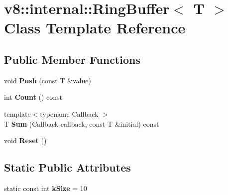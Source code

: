 \hypertarget{classv8_1_1internal_1_1_ring_buffer}{}\section{v8\+:\+:internal\+:\+:Ring\+Buffer$<$ T $>$ Class Template Reference}
\label{classv8_1_1internal_1_1_ring_buffer}
\subsection*{Public Member Functions}
\begin{DoxyCompactItemize}
\item 
void {\bfseries Push} (const T \&value)\hypertarget{classv8_1_1internal_1_1_ring_buffer_a50e222feefcec4e624034aebc8232996}{}\label{classv8_1_1internal_1_1_ring_buffer_a50e222feefcec4e624034aebc8232996}

\item 
int {\bfseries Count} () const \hypertarget{classv8_1_1internal_1_1_ring_buffer_a231e025f0bfcef3e488377eb386d456b}{}\label{classv8_1_1internal_1_1_ring_buffer_a231e025f0bfcef3e488377eb386d456b}

\item 
{\footnotesize template$<$typename Callback $>$ }\\T {\bfseries Sum} (Callback callback, const T \&initial) const \hypertarget{classv8_1_1internal_1_1_ring_buffer_a3c727c135f918833c5d12d556b6c38a7}{}\label{classv8_1_1internal_1_1_ring_buffer_a3c727c135f918833c5d12d556b6c38a7}

\item 
void {\bfseries Reset} ()\hypertarget{classv8_1_1internal_1_1_ring_buffer_a0306040d131c93200cc6d132c23bc006}{}\label{classv8_1_1internal_1_1_ring_buffer_a0306040d131c93200cc6d132c23bc006}

\end{DoxyCompactItemize}
\subsection*{Static Public Attributes}
\begin{DoxyCompactItemize}
\item 
static const int {\bfseries k\+Size} = 10\hypertarget{classv8_1_1internal_1_1_ring_buffer_afc6893b6f708a2e46bedf42872275e99}{}\label{classv8_1_1internal_1_1_ring_buffer_afc6893b6f708a2e46bedf42872275e99}

\end{DoxyCompactItemize}
